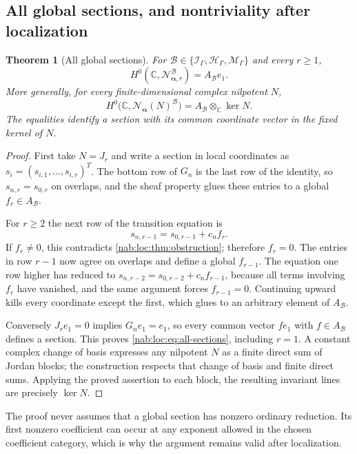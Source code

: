 \documentclass[11pt,letterpaper]{article}
\newtheorem{theorem}{Theorem}[section]
\theoremstyle{definition}
\theoremstyle{remark}
\newcommand{\C}{\mathbb C}
\newcommand{\HH}{\mathscr H_\Gamma}
\newcommand{\II}{\mathscr I_\Gamma}
\newcommand{\MM}{\mathscr M_\Gamma}
\newcommand{\BB}{\mathscr B}
\newcommand{\Aglob}{A_{\BB}}
\newcommand{\profile}{\boldsymbol\alpha}
\newcommand{\NN}[1]{\mathcal N_{\profile,#1}}
\numberwithin{equation}{section}
\begin{document}
\subsection{All global sections, and nontriviality after localization}

\begin{theorem}[All global sections]\label{nab:loc:thm:sections}
For $\BB\in\{\II,\HH,\MM\}$ and every $r\geq1$,
\begin{equation}\label{nab:loc:eq:all-sections}
 H^0(\C,\NN r^{\BB})=\Aglob e_1.
\end{equation}
More generally, for every finite-dimensional complex nilpotent $N$,
\begin{equation}\label{nab:loc:eq:sections-N}
 H^0\bigl(\C,\mathcal N_{\profile}(N)^{\BB}\bigr)=\Aglob\otimes_\C\ker N.
\end{equation}
The equalities identify a section with its common coordinate vector in the
fixed kernel of $N$.
\end{theorem}

\begin{proof}
First take $N=J_r$ and write a section in local coordinates as
$s_i=(s_{i,1},\ldots,s_{i,r})^T$. The bottom row of $G_n$ is the last row of the
identity, so $s_{n,r}=s_{0,r}$ on overlaps, and the sheaf property glues these
entries to a global $f_r\in\Aglob$.

For $r\geq2$ the next row of the transition equation is
\[
 s_{n,r-1}=s_{0,r-1}+c_nf_r.
\]
If $f_r\neq0$, this contradicts \cref{nab:loc:thm:obstruction}; therefore
$f_r=0$. The entries in row $r-1$ now agree on overlaps and define a global
$f_{r-1}$. The equation one row higher has reduced to
$s_{n,r-2}=s_{0,r-2}+c_nf_{r-1}$, because all terms involving $f_r$ have
vanished, and the same argument forces $f_{r-1}=0$. Continuing upward kills
every coordinate except the first, which glues to an arbitrary element of
$\Aglob$.

Conversely $J_re_1=0$ implies $G_ne_1=e_1$, so every common vector $fe_1$ with
$f\in\Aglob$ defines a section. This proves \eqref{nab:loc:eq:all-sections},
including $r=1$. A constant complex change of basis expresses any nilpotent $N$
as a finite direct sum of Jordan blocks; the construction respects that change
of basis and finite direct sums. Applying the proved assertion to each block,
the resulting invariant lines are precisely $\ker N$.
\end{proof}

The proof never assumes that a global section has nonzero ordinary reduction.
Its first nonzero coefficient can occur at any exponent allowed in the chosen
coefficient category, which is why the argument remains valid after
localization.
\end{document}
